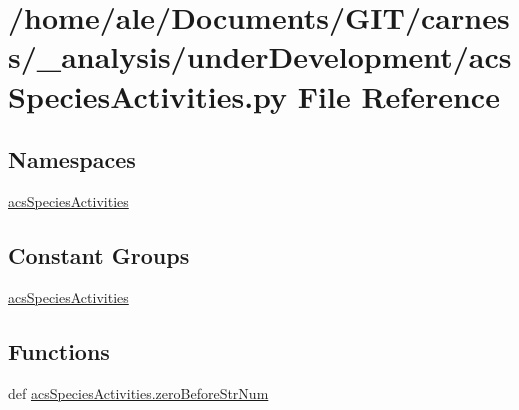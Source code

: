 \hypertarget{a00040}{\section{/home/ale/\-Documents/\-G\-I\-T/carness/\-\_\-analysis/under\-Development/acs\-Species\-Activities.py File Reference}
\label{a00040}
}
\subsection*{Namespaces}
\begin{DoxyCompactItemize}
\item 
\hyperlink{a00097}{acs\-Species\-Activities}
\end{DoxyCompactItemize}
\subsection*{Constant Groups}
\begin{DoxyCompactItemize}
\item 
\hyperlink{a00097}{acs\-Species\-Activities}
\end{DoxyCompactItemize}
\subsection*{Functions}
\begin{DoxyCompactItemize}
\item 
def \hyperlink{a00097_ac217c91fe2eee20671291adb12bbbbb2}{acs\-Species\-Activities.\-zero\-Before\-Str\-Num}
\end{DoxyCompactItemize}

